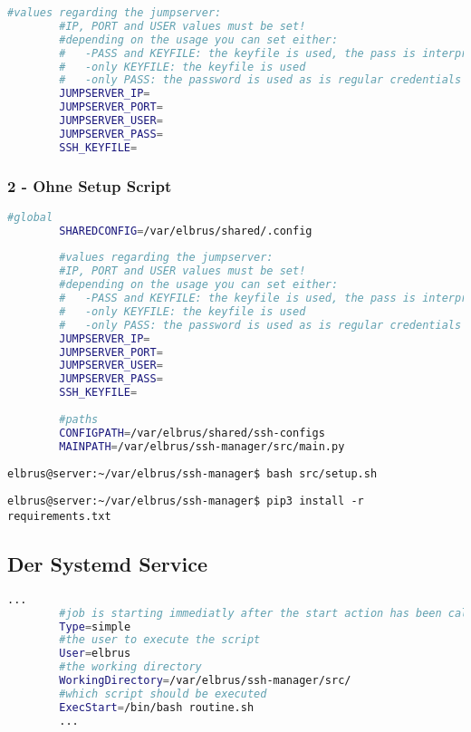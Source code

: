 \documentclass{article}
\begin{document}
	\newpage
	\lstset{style=files}
	\begin{lstlisting}[caption={Ergänzen der fehlenden Werten in '.env'.}, language=bash]
		#values regarding the jumpserver:
		#IP, PORT and USER values must be set!
		#depending on the usage you can set either:
		#   -PASS and KEYFILE: the keyfile is used, the pass is interpreted as the passphrase
		#   -only KEYFILE: the keyfile is used
		#   -only PASS: the password is used as is regular credentials
		JUMPSERVER_IP=
		JUMPSERVER_PORT=
		JUMPSERVER_USER=
		JUMPSERVER_PASS=
		SSH_KEYFILE=
	\end{lstlisting}
	
	\subsubsection{2 - Ohne Setup Script}
	\lstset{style=files}
	\begin{lstlisting}[caption={Anhand von '.env.example' eigene '.env' Datei anlegen.}, language=bash]
		#global
		SHAREDCONFIG=/var/elbrus/shared/.config
		
		#values regarding the jumpserver:
		#IP, PORT and USER values must be set!
		#depending on the usage you can set either:
		#   -PASS and KEYFILE: the keyfile is used, the pass is interpreted as the passphrase
		#   -only KEYFILE: the keyfile is used
		#   -only PASS: the password is used as is regular credentials
		JUMPSERVER_IP=
		JUMPSERVER_PORT=
		JUMPSERVER_USER=
		JUMPSERVER_PASS=
		SSH_KEYFILE=
		
		#paths
		CONFIGPATH=/var/elbrus/shared/ssh-configs
		MAINPATH=/var/elbrus/ssh-manager/src/main.py
	\end{lstlisting}

	\lstset{style=commands}	
	\begin{lstlisting}[caption={Ausführen des Scripts zur Initialisierung des VCS Verzeichnisses.}]
		elbrus@server:~/var/elbrus/ssh-manager$ bash src/setup.sh
	\end{lstlisting}

	\begin{lstlisting}[caption={Installieren von fehlenden python3 Packages.}]
		elbrus@server:~/var/elbrus/ssh-manager$ pip3 install -r requirements.txt
	\end{lstlisting}
	
	\newpage
	\subsection[systemd service]{Der Systemd Service}
	\lstset{style=files}
	\begin{lstlisting}[caption={ssh-manager.service.example - Die Variable 'WorkingDirectory' sowie die Variable 'User' anpassen.},language=bash ,keywords={WorkingDirectory, User}, keywordstyle=\color{red}, firstnumber=5]
		...
		#job is starting immediatly after the start action has been called
		Type=simple
		#the user to execute the script
		User=elbrus
		#the working directory
		WorkingDirectory=/var/elbrus/ssh-manager/src/
		#which script should be executed
		ExecStart=/bin/bash routine.sh
		...
	\end{lstlisting}
	
\end{document}
